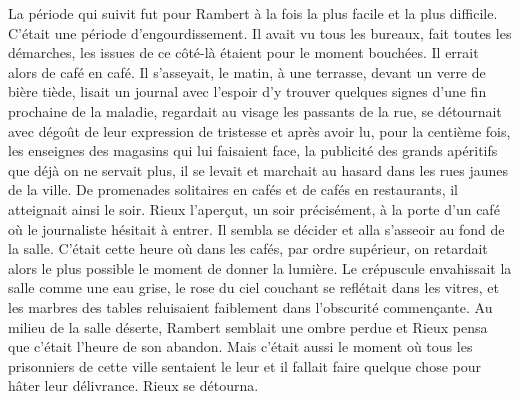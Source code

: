 \documentclass[french,twoside]{book} %
\begin{document}
La période qui suivit fut pour Rambert à la fois la plus facile et la plus difficile. C’était une période d’engourdissement. Il avait vu tous les bureaux, fait toutes les démarches, les issues de ce côté-là étaient pour le moment bouchées. Il errait alors de café en café. Il s’asseyait, le matin, à une terrasse, devant un verre de bière tiède, lisait un journal avec l’espoir d’y trouver quelques signes d’une fin prochaine de la maladie, regardait au visage les passants de la rue, se détournait avec dégoût de leur expression de tristesse et après avoir lu, pour la centième fois, les enseignes des magasins qui lui faisaient face, la publicité des grands apéritifs que déjà on ne servait plus, il se levait et marchait au hasard dans les rues jaunes de la ville. De promenades solitaires en cafés et de cafés en restaurants, il atteignait ainsi le soir. Rieux l’aperçut, un soir précisément, à la porte d’un café où le journaliste hésitait à entrer. Il sembla se décider et alla s’asseoir au fond de la salle. C’était cette heure où dans les cafés, par ordre supérieur, on retardait alors le plus possible le moment de donner la lumière. Le crépuscule envahissait la salle comme une eau grise, le rose du ciel couchant se reflétait dans les vitres, et les marbres des tables reluisaient faiblement dans l’obscurité commençante. Au milieu de la salle déserte, Rambert semblait une ombre perdue et Rieux pensa que c’était l’heure de son abandon. Mais c’était aussi le moment où tous les prisonniers de cette ville sentaient le leur et il fallait faire quelque chose pour hâter leur délivrance. Rieux se détourna.\par
\end{document}
